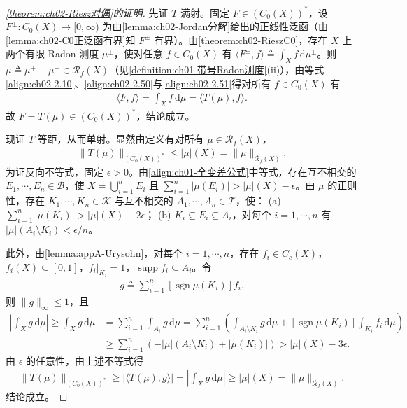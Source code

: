 \documentclass[../../main.tex]{subfiles}%
\begin{document}
\begin{proof}[\cref{theorem:ch02-Riesz对偶}的证明]
先证 $T$ 满射。固定 $F\in(C_0(X))^*$，设 $F^\pm:C_0(X)\to[0,\infty)$ 为由\cref{lemma:ch02-Jordan分解}给出的正线性泛函（由\cref{lemma:ch02-C0正泛函有界}知 $F^\pm$ 有界）。由\cref{theorem:ch02-RieszC0}，存在 $X$ 上两个有限 Radon 测度 $\mu^\pm$，使对任意 $f\in C_0(X)$ 有 $\langle F^\pm,f\rangle\triangleq \int_X f\,\mathrm{d}\mu^\pm$。则 $\mu\triangleq \mu^+-\mu^-\in\mathscr R_f(X)$（见\cref{definition:ch01-带号Radon测度}(ii)），由等式\eqref{align:ch02-2.10}、\eqref{align:ch02-2.50}与\eqref{align:ch02-2.51}得对所有 $f\in C_0(X)$ 有
\begin{align*}
\langle F,f\rangle=\int_X f\,\mathrm{d}\mu=\langle T(\mu),f\rangle.
\end{align*}
故 $F=T(\mu)\in(C_0(X))^*$，结论成立。

现证 $T$ 等距，从而单射。显然由定义有对所有 $\mu\in\mathscr R_f(X)$，
\begin{align*}
\|T(\mu)\|_{(C_0(X))^*}\leqslant|\mu|(X)=\|\mu\|_{\mathscr R_f(X)}.
\end{align*}
为证反向不等式，固定 $\epsilon>0$。由\eqref{align:ch01-全变差公式}中等式，存在互不相交的 $E_1,\cdots ,E_n\in\mathscr B$，使 $X=\bigcup_{i=1}^n E_i$ 且 $\sum_{i=1}^n|\mu(E_i)|>|\mu|(X)-\epsilon$。由 $\mu$ 的正则性，存在 $K_1,\cdots ,K_n\in\mathscr K$ 与互不相交的 $A_1,\cdots ,A_n\in\mathscr T$，使：
(a) $\sum_{i=1}^n|\mu(K_i)|>|\mu|(X)-2\epsilon$；
(b) $K_i\subseteq E_i\subseteq A_i$，对每个 $i=1,\cdots ,n$ 有 $|\mu|(A_i\setminus K_i)<\epsilon/n$。

此外，由\cref{lemma:appA-Urysohn}，对每个 $i=1,\cdots ,n$，存在 $f_i\in C_c(X)$，$f_i(X)\subseteq[0,1]$，$f_i|_{K_i}=1$，$\operatorname{supp}f_i\subseteq A_i$。令
\begin{align*}
g\triangleq \sum_{i=1}^n[\operatorname{sgn}\mu(K_i)]f_i.
\end{align*}
则 $\|g\|_\infty\leqslant1$，且
\begin{align*}
\left|\int_X g\,\mathrm{d}\mu\right|\geqslant\int_X g\,\mathrm{d}\mu
&=\sum_{i=1}^n\int_{A_i}g\,\mathrm{d}\mu
=\sum_{i=1}^n\left(\int_{A_i\setminus K_i}g\,\mathrm{d}\mu+[\operatorname{sgn}\mu(K_i)]\int_{K_i}f_i\,\mathrm{d}\mu\right)\\
&\geqslant\sum_{i=1}^n\left(-|\mu|(A_i\setminus K_i)+|\mu(K_i)|\right)>|\mu|(X)-3\epsilon.
\end{align*}
由 $\epsilon$ 的任意性，由上述不等式得
\begin{align*}
\|T(\mu)\|_{(C_0(X))^*}\geqslant|\langle T(\mu),g\rangle|
=\left|\int_X g\,\mathrm{d}\mu\right|\geqslant|\mu|(X)=\|\mu\|_{\mathscr R_f(X)}.
\end{align*}
结论成立。
\end{proof}
\end{document}
